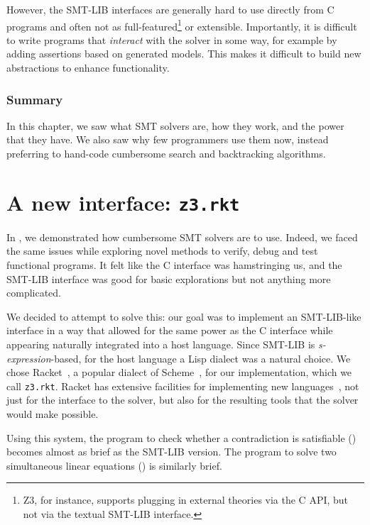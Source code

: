 However, the SMT-LIB interfaces are generally hard to use directly from C
programs and often not as full-featured\footnote{Z3, for instance, supports
plugging in external theories via the C API, but not via the textual SMT-LIB
interface.}  or extensible. Importantly, it is difficult to write programs
that \textit{interact} with the solver in some way, for example by adding
assertions based on generated models. This makes it difficult to build new
abstractions to enhance functionality.

\subsection*{Summary}

In this chapter, we saw what SMT solvers are, how they work, and the power
that they have. We also saw why few programmers use them now, instead
preferring to hand-code cumbersome search and backtracking algorithms.

\chapter{A new interface: \texttt{z3.rkt}}

In , we demonstrated how cumbersome SMT solvers are to
use. Indeed, we faced the same issues while exploring novel methods to verify,
debug and test functional programs. It felt like the C interface was
hamstringing us, and the SMT-LIB interface was good for basic explorations but
not anything more complicated.

We decided to attempt to solve this: our goal was to implement an SMT-LIB-like
interface in a way that allowed for the same power as the C interface while
appearing naturally integrated into a host language. Since SMT-LIB is {\em
s-expression}-based, for the host language a Lisp dialect was a natural
choice. We chose Racket~\cite{racket}, a popular dialect of
Scheme~\cite{scheme-r5rs,scheme-r6rs},
for our implementation, which we call \texttt{z3.rkt}. Racket has
extensive facilities for implementing new languages~\cite{Tobin-Hochstadt:11},
not just for the interface to the solver, but also for the resulting tools
that the solver would make possible.

Using this system, the program to check whether a contradiction is satisfiable
() becomes almost as brief as the SMT-LIB version. The
program to solve two simultaneous linear equations () is
similarly brief.

